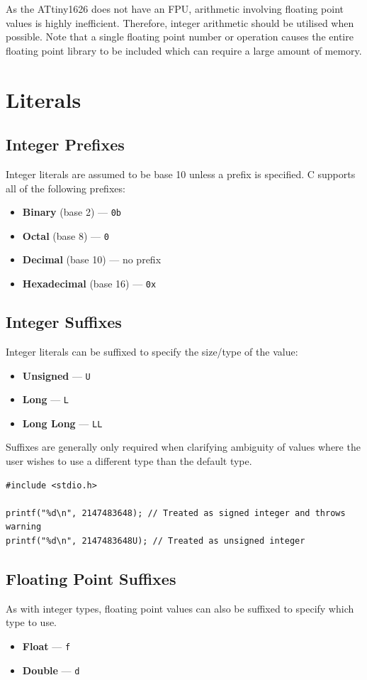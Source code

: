 \documentclass{report}
\begin{document}
As the ATtiny1626 does not have an FPU, arithmetic involving floating point values is highly inefficient. Therefore,
integer arithmetic should be utilised when possible. Note that a single floating point number or operation causes
the entire floating point library to be included which can require a large amount of memory.
\chapter{Literals}
\section{Integer Prefixes}
Integer literals are assumed to be base 10 unless a prefix is specified. C supports
all of the following prefixes:
\begin{itemize}
    \item \textbf{Binary} (base 2) --- \texttt{0b}
    \item \textbf{Octal} (base 8) --- \texttt{0}
    \item \textbf{Decimal} (base 10) --- no prefix
    \item \textbf{Hexadecimal} (base 16) --- \texttt{0x}
\end{itemize}
\section{Integer Suffixes}
Integer literals can be suffixed to specify the size/type of the value:
\begin{itemize}
    \item \textbf{Unsigned} --- \texttt{U}
    \item \textbf{Long} --- \texttt{L}
    \item \textbf{Long Long} --- \texttt{LL}
\end{itemize}
Suffixes are generally only required when clarifying ambiguity of values where the user wishes to use a different type than the default type.
\begin{verbatim}
#include <stdio.h>

printf("%d\n", 2147483648); // Treated as signed integer and throws warning
printf("%d\n", 2147483648U); // Treated as unsigned integer
\end{verbatim}
\section{Floating Point Suffixes}
As with integer types, floating point values can also be suffixed to specify which type to use.
\begin{itemize}
    \item \textbf{Float} --- \texttt{f}
    \item \textbf{Double} --- \texttt{d}
\end{itemize}
\end{document}

